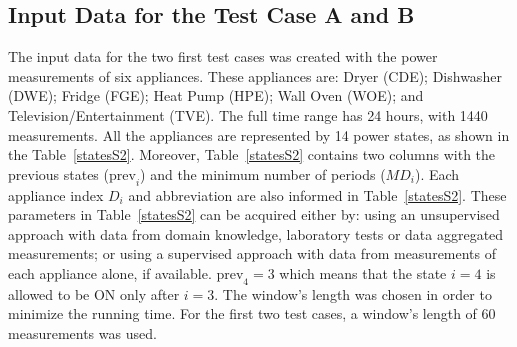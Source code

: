 \subsection{Input Data for the Test Case A and B}

The input data for the two first test cases was created with the power measurements of six appliances. These appliances are: Dryer (CDE); Dishwasher (DWE); Fridge (FGE); Heat Pump (HPE); Wall Oven (WOE); and Television/Entertainment (TVE). The full time range has 24 hours, with 1440 measurements. All the appliances are represented by 14 power states, as shown in the Table~\ref{statesS2}. Moreover, Table~\ref{statesS2} contains two columns with the previous states ($\text{prev}_i$) and the minimum number of periods ($MD_i$). Each appliance index $D_i$ and abbreviation are also informed in Table~\ref{statesS2}. These parameters in Table~\ref{statesS2} can be acquired either by: using an unsupervised approach with data from domain knowledge, laboratory tests or data aggregated measurements; or using a supervised approach with data from measurements of each appliance alone, if available. $\text{prev}_4 = 3$ which means that the state $i=4$ is allowed to be ON only after $i=3$. The window's length was chosen in order to minimize the running time. For the first two test cases, a window's length of 60 measurements was used. 

